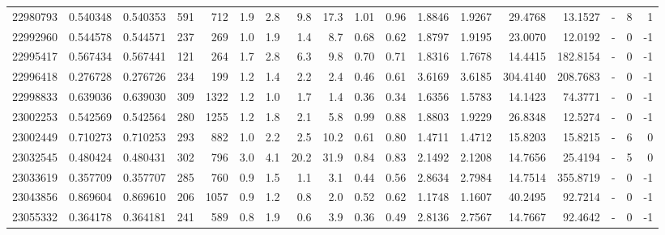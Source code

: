 \begin{tabular}{rrrrrrrrrrrrrrrlrr}
  22980793 & 0.540348 &   0.540353 &  591 &  712 &      1.9 &      2.8 &     9.8 &     17.3 &       1.01 &        0.96 &  1.8846 &  1.9267 &   29.4768 &   13.1527 &             - &        8 &          1 \\
  22992960 & 0.544578 &   0.544571 &  237 &  269 &      1.0 &      1.9 &     1.4 &      8.7 &       0.68 &        0.62 &  1.8797 &  1.9195 &   23.0070 &   12.0192 &             - &        0 &         -1 \\
  22995417 & 0.567434 &   0.567441 &  121 &  264 &      1.7 &      2.8 &     6.3 &      9.8 &       0.70 &        0.71 &  1.8316 &  1.7678 &   14.4415 &  182.8154 &             - &        0 &         -1 \\
  22996418 & 0.276728 &   0.276726 &  234 &  199 &      1.2 &      1.4 &     2.2 &      2.4 &       0.46 &        0.61 &  3.6169 &  3.6185 &  304.4140 &  208.7683 &             - &        0 &         -1 \\
  22998833 & 0.639036 &   0.639030 &  309 & 1322 &      1.2 &      1.0 &     1.7 &      1.4 &       0.36 &        0.34 &  1.6356 &  1.5783 &   14.1423 &   74.3771 &             - &        0 &         -1 \\
  23002253 & 0.542569 &   0.542564 &  280 & 1255 &      1.2 &      1.8 &     2.1 &      5.8 &       0.99 &        0.88 &  1.8803 &  1.9229 &   26.8348 &   12.5274 &             - &        0 &         -1 \\
  23002449 & 0.710273 &   0.710253 &  293 &  882 &      1.0 &      2.2 &     2.5 &     10.2 &       0.61 &        0.80 &  1.4711 &  1.4712 &   15.8203 &   15.8215 &             - &        6 &          0 \\
  23032545 & 0.480424 &   0.480431 &  302 &  796 &      3.0 &      4.1 &    20.2 &     31.9 &       0.84 &        0.83 &  2.1492 &  2.1208 &   14.7656 &   25.4194 &             - &        5 &          0 \\
  23033619 & 0.357709 &   0.357707 &  285 &  760 &      0.9 &      1.5 &     1.1 &      3.1 &       0.44 &        0.56 &  2.8634 &  2.7984 &   14.7514 &  355.8719 &             - &        0 &         -1 \\
  23043856 & 0.869604 &   0.869610 &  206 & 1057 &      0.9 &      1.2 &     0.8 &      2.0 &       0.52 &        0.62 &  1.1748 &  1.1607 &   40.2495 &   92.7214 &             - &        0 &         -1 \\
  23055332 & 0.364178 &   0.364181 &  241 &  589 &      0.8 &      1.9 &     0.6 &      3.9 &       0.36 &        0.49 &  2.8136 &  2.7567 &   14.7667 &   92.4642 &             - &        0 &         -1 \\

\end{tabular}

